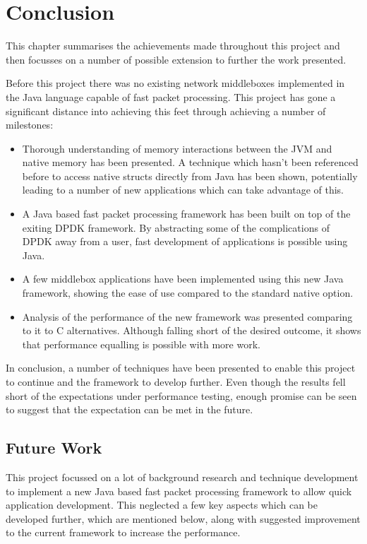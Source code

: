 \documentclass[final_report.tex]{subfiles}
\begin{document}
\section{Conclusion}
\label{sec:conclusion}
This chapter summarises the achievements made throughout this project and then focusses on a number of possible extension to further the work presented.

Before this project there was no existing network middleboxes implemented in the Java language capable of fast packet processing. This project has gone a significant distance into achieving this feet through achieving a number of milestones:

\begin{itemize}
	\item Thorough understanding of memory interactions between the JVM and native memory has been presented. A technique which hasn't been referenced before to access native structs directly from Java has been shown, potentially leading to a number of new applications which can take advantage of this.
	\item A Java based fast packet processing framework has been built on top of the exiting DPDK framework. By abstracting some of the complications of DPDK away from a user, fast development of applications is possible using Java.
	\item A few middlebox applications have been implemented using this new Java framework, showing the ease of use compared to the standard native option.
	\item Analysis of the performance of the new framework was presented comparing to it to C alternatives. Although falling short of the desired outcome, it shows that performance equalling is possible with more work.
\end{itemize}

In conclusion, a number of techniques have been presented to enable this project to continue and the framework to develop further. Even though the results fell short of the expectations under performance testing, enough promise can be seen to suggest that the expectation can be met in the future.

\subsection{Future Work}
This project focussed on a lot of background research and technique development to implement a new Java based fast packet processing framework to allow quick application development. This neglected a few key aspects which can be developed further, which are mentioned below, along with suggested improvement to the current framework to increase the performance.
\end{document}
